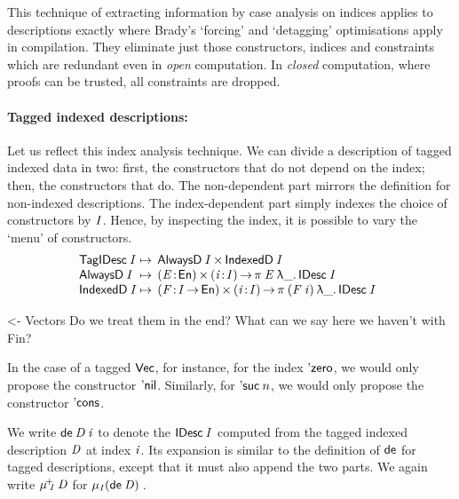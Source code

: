 This technique of extracting information by case analysis on indices
applies to descriptions exactly where Brady's `forcing' and
`detagging' optimisations apply in compilation. They eliminate just
those constructors, indices and constraints which are redundant even
in \emph{open} computation. In \emph{closed} computation, where proofs
can be trusted, all constraints are dropped.


\paragraph{Tagged indexed descriptions:}

\newcommand{\SYMBmuide}{\D{\({\mu}^{\!+}\)}\xspace}
\newcommand{\muide}[2]{\SYMBmuide\!\!_{#1}\:#2}

Let us reflect this index analysis technique.
We can divide a description of tagged indexed data in two: first, the
constructors that do not depend on the index; then, the constructors
that do. The non-dependent part mirrors the definition for non-indexed
descriptions. The index-dependent part simply indexes the choice of
constructors by $\V{I}$. Hence, by inspecting the index, it is
possible to vary the `menu' of constructors.
%
\[
\begin{array}{@{}l@{\:\mapsto\:\:}l}
 \TagIDesc{\V{I}}  & \TIMES{\ATagIDesc{\V{I}}}{\ITagIDesc{\V{I}}} \\
 \ATagIDesc{\V{I}} & \SIGMA{\V{E}}{\EnumU} \PI{\V{i}}{\V{I}} \spi{\V{E}}{\LAM{\_} \IDesc{\V{I}}} \\
 \ITagIDesc{\V{I}} & 
     \SIGMA{\V{F}}{\V{I} \To \EnumU} \PI{\V{i}}{\V{I}} \spi{(\V{F}\: \V{i})}{\LAM{\_} \IDesc{\V{I}}} 
\end{array}
\]

\begin{wstructure}
<- Vectors
    Do we treat them in the end? 
    What can we say here we haven't with Fin?
\end{wstructure}

In the case of a tagged $\D{Vec}$, for instance, for the index
$\NatZero$, we would only propose the constructor
$\ListNil$. Similarly, for $\NatSuc{n}$, we would only propose the
constructor $\SYMBListCons$.

We write $\toIDesc{\V{D}}\:\V{i}$ to denote the $\IDesc{\V{I}}$
computed from the tagged indexed description $\V{D}$ at index
$\V{i}$. Its expansion is similar to the definition of \(\SYMBtoDesc\)
for tagged descriptions, except that it must also append the two parts.
We again write $\muide{\V{I}}{\V{D}}$ for
$\IMu{\V{I}}{(\toIDesc{\V{D}})}$.


